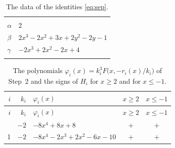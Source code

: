 \documentclass[11pt]{article}
\begin{document}
\begingroup\footnotesize
\setlength{\LTcapwidth}{\textwidth}
\begin{longtable}{@{}ll@{}}
\caption{The data of the identities \eqref{eq:sep}.}\label{tab:sep}\\
\hline\endfirsthead\hline\endhead\hline\endfoot
\multicolumn{2}{@{}l}{$\{i,j\}=\{0,1\}$, $k_{ij}=2$}\\
$\alpha$ & $2$\\
$\beta$ & $2x^{3}-2x^{2}+3x+2y^{2}-2y-1$\\
$\gamma$ & $-2x^{3}+2x^{2}-2x+4$\\
\addlinespace[3pt]
\end{longtable}
\endgroup

\begingroup\footnotesize
\setlength{\LTcapwidth}{\textwidth}
\begin{longtable}{@{}rrlcc@{}}
\caption{The polynomials $\varphi_i(x)=k_i^3F\bigl(x,-r_i(x)/k_i\bigr)$ of Step~2 and the signs of $H_i$ for $x\geq2$ and for $x\leq-1$.}\label{tab:phi}\\
\hline $i$ & $k_i$ & $\varphi_i(x)$ & $x\geq2$ & $x\leq-1$\\\hline\endfirsthead\hline $i$ & $k_i$ & $\varphi_i(x)$ & $x\geq2$ & $x\leq-1$\\\hline\endhead\hline\endfoot
0 & $-2$ & $-8x^{4}+8x+8$ & $+$ & $+$\\
1 & $-2$ & $-8x^{4}-2x^{3}+2x^{2}-6x-10$ & $+$ & $+$\\
\end{longtable}
\endgroup
\end{document}
